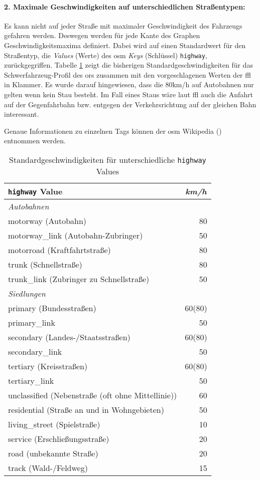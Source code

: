 \paragraph*{2. Maximale Geschwindigkeiten auf unterschiedlichen Straßentypen:}
\label{frage2}
\par
Es kann nicht auf jeder Straße mit maximaler Geschwindigkeit des Fahrzeugs gefahren werden.
Deswegen werden für jede Kante des Graphen Geschwindigkeitsmaxima definiert.
Dabei wird auf einen Standardwert für den Straßentyp, die \textit{Values} (Werte) des \gls{osm} \textit{Keys} (Schlüssel) \texttt{highway}, zurückgegriffen.
Tabelle \ref{tab:speedinfo} zeigt die bisherigen Standardgeschwindigkeiten für das Schwerfahrzeug-Profil des \gls{ors} zusammen mit den vorgeschlagenen Werten der \gls{ffl} in Klammer.
Es wurde darauf hingewiesen, dass die 80km/h auf Autobahnen nur gelten wenn kein Stau besteht.
Im Fall eines Staus wäre laut \gls{ffl} auch die Anfahrt auf der Gegenfahrbahn bzw. entgegen der Verkehrsrichtung auf der gleichen Bahn interessant.

Genaue Informationen zu einzelnen Tags können der \gls{osm} Wikipedia (\cite{osmwiki}) entnommen werden.

\begin{table}[htb]
\centering
\caption{Standardgeschwindigkeiten für unterschiedliche \texttt{highway} Values}
\label{tab:speedinfo}
\begin{tabular}{|l|r|}
\hline
\multicolumn{1}{|l|}{\texttt{highway} Value} & \multicolumn{1}{c|}{\textit{km/h}} \\
\hline
\multicolumn{2}{|l|}{\textit{Autobahnen}} \\
\hline
motorway (Autobahn) & 80 \\
motorway\_link (Autobahn-Zubringer) & 50 \\
motorroad (Kraftfahrtstraße) & 80 \\
trunk (Schnellstraße) & 80 \\
trunk\_link (Zubringer zu Schnellstraße) & 50 \\
\hline
\multicolumn{1}{|l}{\textit{Siedlungen}} & \multicolumn{1}{l|}{ } \\
\hline
primary (Bundesstraßen) & 60(80) \\
primary\_link  & 50 \\
secondary (Landes-/Staatsstraßen) & 60(80) \\
secondary\_link  & 50 \\
tertiary (Kreisstraßen) & 60(80) \\
tertiary\_link  & 50 \\
unclassified (Nebenstraße (oft ohne Mittellinie))  & 60 \\
residential (Straße an und in Wohngebieten) & 50 \\
living\_street (Spielstraße)  & 10 \\
service (Erschließungsstraße) & 20 \\
road (unbekannte Straße) & 20 \\
track (Wald-/Feldweg) & 15 \\
\hline
\end{tabular}
\end{table}

